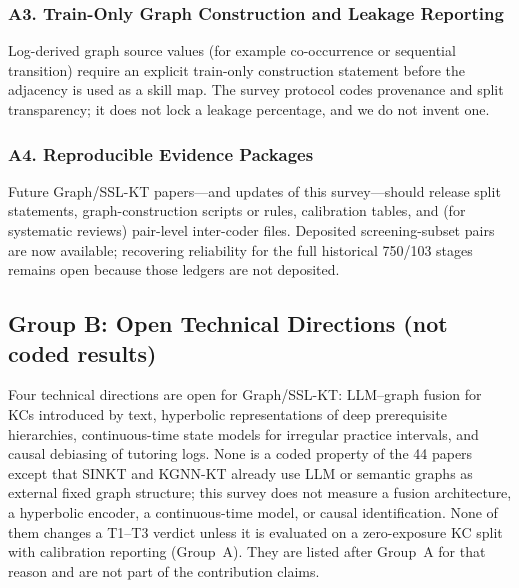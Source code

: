 \documentclass[lettersize,journal]{IEEEtran}
\begin{document}
\subsubsection{A3. Train-Only Graph Construction and Leakage Reporting}
Log-derived graph source values (for example co-occurrence or sequential transition) require an explicit train-only construction statement before the adjacency is used as a skill map. The survey protocol codes provenance and split transparency; it does not lock a leakage percentage, and we do not invent one.

\subsubsection{A4. Reproducible Evidence Packages}
Future Graph/SSL-KT papers---and updates of this survey---should release split statements, graph-construction scripts or rules, calibration tables, and (for systematic reviews) pair-level inter-coder files. Deposited screening-subset pairs are now available; recovering reliability for the full historical 750/103 stages remains open because those ledgers are not deposited.

\subsection{Group B: Open Technical Directions (not coded results)}
Four technical directions are open for Graph/SSL-KT: LLM--graph fusion for KCs introduced by text, hyperbolic representations of deep prerequisite hierarchies, continuous-time state models for irregular practice intervals, and causal debiasing of tutoring logs. None is a coded property of the 44 papers except that SINKT and KGNN-KT already use LLM or semantic graphs as external fixed graph structure; this survey does not measure a fusion architecture, a hyperbolic encoder, a continuous-time model, or causal identification. None of them changes a T1--T3 verdict unless it is evaluated on a zero-exposure KC split with calibration reporting (Group~A). They are listed after Group~A for that reason and are not part of the contribution claims.
\end{document}
